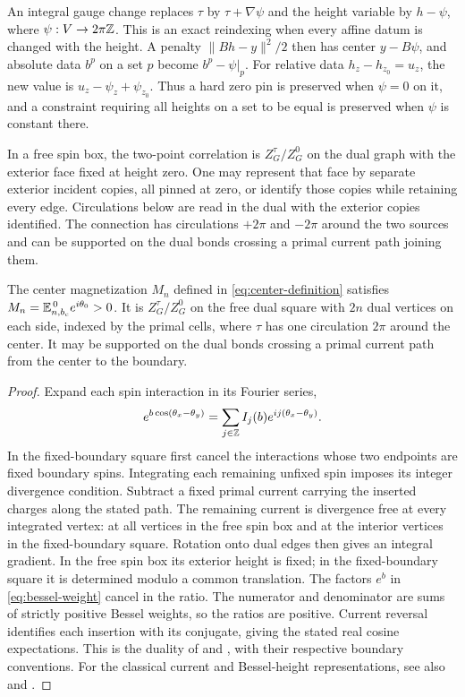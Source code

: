 An integral gauge change replaces \(\tau\) by \(\tau+\nabla\psi\) and
the height variable by \(h-\psi\), where \(\psi:V\to2\pi\mathbb Z\).
This is an exact reindexing when every affine datum is changed with
the height.  A penalty \(\|Bh-y\|^2/2\) then has center \(y-B\psi\),
and absolute data \(b^p\) on a set \(p\) become \(b^p-\psi|_p\).
For relative data \(h_z-h_{z_0}=u_z\), the new value is
\(u_z-\psi_z+\psi_{z_0}\).  Thus a hard zero pin is preserved when
\(\psi=0\) on it, and a constraint requiring all heights on a set
to be equal is preserved when \(\psi\) is constant there.

\begin{lemma}\label{lem:duality}
In a free spin box, the two-point correlation is \(Z_G^\tau/Z_G^0\)
on the dual graph with the exterior face fixed at height zero.
One may represent that face by separate exterior incident copies, all
pinned at zero, or identify those copies while retaining every edge.
Circulations below are read in the dual with the exterior copies identified.
The connection has circulations \(+2\pi\) and \(-2\pi\) around the
two sources and can be supported on the dual bonds crossing a primal
current path joining them.

The center magnetization \(M_n\) defined in
\eqref{eq:center-definition} satisfies
\(M_n=\mathbb E_{n,b_c}^{\,0}e^{i\theta_0}>0\).
It is \(Z_G^\tau/Z_G^0\) on the free dual square with
\(2n\) dual vertices on each side, indexed by the primal cells, where
\(\tau\) has one circulation \(2\pi\) around the center.  It may be
supported on the dual bonds crossing a primal current path from the
center to the boundary.
\end{lemma}

\begin{proof}
Expand each spin interaction in its Fourier series,
\[
 e^{b\cos(\theta_x-\theta_y)}
 =\sum_{j\in\mathbb Z}I_j(b)e^{ij(\theta_x-\theta_y)}.
\]
In the fixed-boundary square first cancel the interactions whose two
endpoints are fixed boundary spins.  Integrating each remaining
unfixed spin imposes its integer divergence condition.  Subtract a
fixed primal current carrying the inserted charges along the stated
path.  The remaining current is divergence free at every integrated
vertex: at all vertices in the free spin box and at the interior
vertices in the fixed-boundary square.  Rotation onto dual edges then
gives an integral gradient.  In the free spin box its exterior height
is fixed; in the fixed-boundary square it is determined modulo a common
translation.  The factors \(e^b\) in \eqref{eq:bessel-weight} cancel
in the ratio.  The numerator and denominator are sums of strictly
positive Bessel weights, so the ratios are positive.  Current reversal
identifies each insertion with its conjugate, giving the stated real
cosine expectations.  This is the duality of \cite[Lemma~2.1]{C} and
\cite[Lemma~2.1]{S}, with their respective boundary conventions.
For the classical current and Bessel-height representations, see also
\cite[Appendix~A]{FrohlichSpencer1981} and
\cite[Section~2]{vanEngelenburgLis2023}.
\end{proof}

